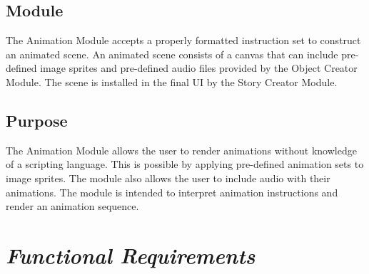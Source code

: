 \documentclass[12pt]{article}
\begin{document}
	\subsection{Module}
	The Animation Module accepts a properly formatted instruction set to construct an animated scene. An animated scene consists of a canvas that can include pre-defined image sprites and pre-defined audio files provided by the Object Creator Module. The scene is installed in the final UI by the Story Creator Module. 
	\subsection{Purpose}
        The Animation Module allows the user to render animations without knowledge of a scripting language. This is possible by applying pre-defined animation sets to image sprites. The module also allows the user to include audio with their animations. The module is intended to interpret animation instructions and render an animation sequence.


\section{\emph{Functional Requirements}}
\end{document}
